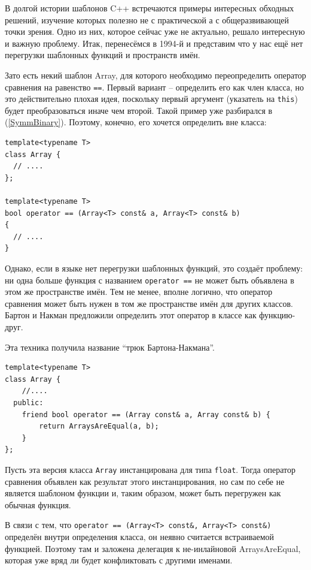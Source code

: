 \documentclass[a4paper,12pt,oneside]{article}
\begin{document}
В долгой истории шаблонов C++ встречаются примеры интересных обходных решений, изучение которых полезно не с практической а с общеразвивающей точки зрения. Одно из них, которое сейчас уже не актуально, решало интересную и важную проблему. Итак, перенесёмся в 1994-й и представим что у нас ещё нет перегрузки шаблонных функций и пространств имён.

Зато есть некий шаблон Array, для которого необходимо переопределить оператор сравнения на равенство \lstinline!==!. Первый вариант -- определить его как член класса, но это действительно плохая идея, поскольку первый аргумент (указатель на \lstinline!this!) будет преобразоваться иначе чем второй. Такой пример уже разбирался в (\ref{SymmBinary}). Поэтому, конечно, его хочется определить вне класса:

\begin{lstlisting}
template<typename T> 
class Array { 
  // ....
}; 

template<typename T> 
bool operator == (Array<T> const& a, Array<T> const& b) 
{ 
  // .... 
} 
\end{lstlisting}

Однако, если в языке нет перегрузки шаблонных функций, это создаёт проблему: ни одна больше функция с названием \lstinline!operator ==! не может быть объявлена в этом же пространстве имён. Тем не менее, вполне логично, что оператор сравнения может быть нужен в том же пространстве имён для других классов. Бартон и Накман предложили определить этот оператор в классе как функцию-друг.

Эта техника получила название ``трюк Бартона-Накмана''.

\begin{lstlisting}
template<typename T> 
class Array { 
    //....
  public: 
    friend bool operator == (Array const& a, Array const& b) {
        return ArraysAreEqual(a, b); 
    } 
}; 
\end{lstlisting}

Пусть эта версия класса \lstinline!Array! инстанцирована для типа \lstinline!float!. Тогда оператор сравнения объявлен как результат этого инстанцирования, но сам по себе не является шаблоном функции и, таким образом, может быть перегружен как обычная функция.

В связи с тем, что \lstinline!operator == (Array<T> const&, Array<T> const&)! определён внутри определения класса, он неявно считается встраиваемой функцией. Поэтому там и заложена делегация к не-инлайновой ArraysAreEqual, которая уже вряд ли будет конфликтовать с другими именами.
\end{document}
